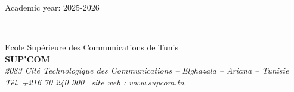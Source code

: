 \documentclass[a4paper,11pt,oneside]{book}
\begin{document}
\begin{titlepage}
\begin{center}
            {\large Academic year: 2025-2026}
        \end{center}

        \vfill 
        \begin{center}
            \setlength{\fboxsep}{0pt} 
            \colorbox{SupcomNavyBorder}{%
                \parbox{\textwidth}{\rule{0pt}{3pt}} 
            }\\[-1pt] 
            \setlength{\fboxsep}{10pt}
            \colorbox{SupcomLightBlue}{%
                \parbox{\dimexpr\textwidth-2\fboxsep}{%
                    \centering\small\color{black} %
                    Ecole Supérieure des Communications de Tunis\\[2pt]
                    \textbf{SUP'COM}\\[2pt]
                    \textit{2083 Cité Technologique des Communications -- Elghazala -- Ariana -- Tunisie}\\[2pt]
                    \textit{Tél. +216 70 240 900 \textendash\ site web : www.supcom.tn}
                }%
            }
        \end{center}
    \end{titlepage}

    
    
    

    \tableofcontents
    \listoffigures
    \listoftables

    
    

    \mainmatter 

    
    
    
    
    

    \begin{appendices}
        
        
    \end{appendices}

    
\end{document}
